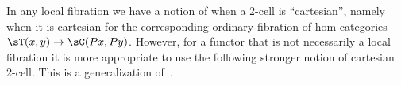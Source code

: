 \documentclass{amsart}
\begin{document}


In any local fibration we have a notion of when a 2-cell is ``cartesian'', namely when it is cartesian for the corresponding ordinary fibration of hom-categories $\sT(x,y) \to \sC(Px,Py)$.
However, for a functor that is not necessarily a local fibration it is more appropriate to use the following stronger notion of cartesian 2-cell.
This is a generalization of~\cite[Definition 2.2]{hermida:2fib}.
\end{document}
